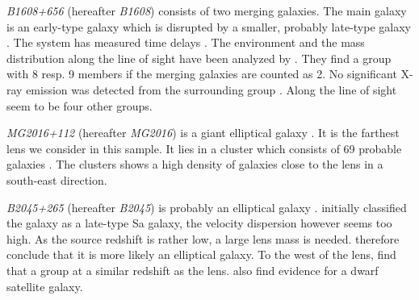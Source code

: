 \documentclass[useAMS,usenatbib]{mn2e}
\begin{document}


\textit{B1608+656} (hereafter \textit{B1608}) consists of two merging galaxies. The main galaxy is an early-type galaxy which is disrupted by a smaller, probably late-type galaxy \citep{2003ApJ...584..100S}. The system has measured time delays \citep{2002ApJ...581..823F}. The environment and the mass distribution along the line of sight have been analyzed by \cite{2006ApJ...642...30F}. They find a group with 8 resp. 9 members if the merging galaxies are counted as 2. No significant X-ray emission was detected from the surrounding group \citep{2005ApJ...625..633D}. Along the line of sight seem to be four other groups.

\textit{MG2016+112} (hereafter \textit{MG2016}) is a giant elliptical galaxy \citep{1984Sci...223...46L,1986AJ.....91..991S}. It is the farthest lens we consider in this sample. It lies in a cluster which consists of 69 probable galaxies \citep{2003MNRAS.344..337T}. The clusters shows a high density of galaxies close to the lens in a south-east direction.

\textit{B2045+265} (hereafter \textit{B2045}) is probably an elliptical galaxy \citep{2007MNRAS.378..109M}. \cite{1999AJ....117..658F} initially classified the galaxy as a late-type Sa galaxy, the velocity dispersion however seems too high. As the source redshift is rather low, a large lens mass is needed. \cite{2007MNRAS.378..109M} therefore conclude that it is more likely an elliptical galaxy. To the west of the lens, \cite{1999AJ....117..658F} find that a group at a similar redshift as the lens. \cite{2007MNRAS.378..109M} also find evidence for a dwarf satellite galaxy.
\end{document}

